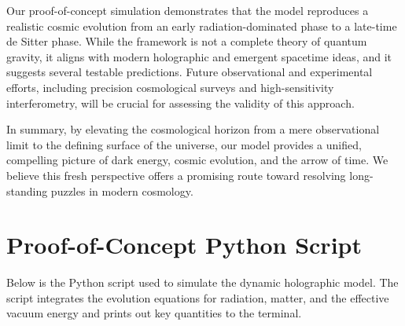 \documentclass[12pt]{article}
\begin{document}
Our proof-of-concept simulation demonstrates that the model reproduces a realistic cosmic evolution from an early radiation-dominated phase to a late-time de Sitter phase. While the framework is not a complete theory of quantum gravity, it aligns with modern holographic and emergent spacetime ideas, and it suggests several testable predictions. Future observational and experimental efforts, including precision cosmological surveys and high-sensitivity interferometry, will be crucial for assessing the validity of this approach.

In summary, by elevating the cosmological horizon from a mere observational limit to the defining surface of the universe, our model provides a unified, compelling picture of dark energy, cosmic evolution, and the arrow of time. We believe this fresh perspective offers a promising route toward resolving long-standing puzzles in modern cosmology.




\newpage

\appendix
\section{Proof-of-Concept Python Script}
Below is the Python script used to simulate the dynamic holographic model. The script integrates the evolution equations for radiation, matter, and the effective vacuum energy and prints out key quantities to the terminal.
\end{document}
